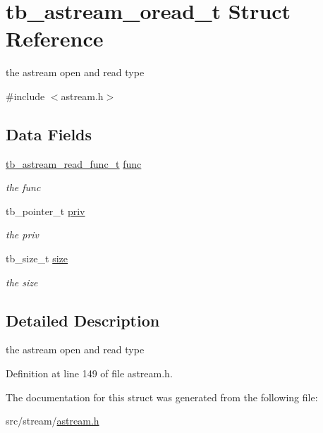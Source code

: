 \hypertarget{structtb__astream__oread__t}{\section{tb\-\_\-astream\-\_\-oread\-\_\-t Struct Reference}
\label{structtb__astream__oread__t}
}


the astream open and read type  




{\ttfamily \#include $<$astream.\-h$>$}

\subsection*{Data Fields}
\begin{DoxyCompactItemize}
\item 
\hypertarget{structtb__astream__oread__t_ae663c845768d8682b3db64a096a4ef1b}{\hyperlink{astream_8h_a94c551da39b2f5d59cf37a8154267c00}{tb\-\_\-astream\-\_\-read\-\_\-func\-\_\-t} \hyperlink{structtb__astream__oread__t_ae663c845768d8682b3db64a096a4ef1b}{func}}\label{structtb__astream__oread__t_ae663c845768d8682b3db64a096a4ef1b}

\begin{DoxyCompactList}\small\item\em the func \end{DoxyCompactList}\item 
\hypertarget{structtb__astream__oread__t_a708c7917b37aa5345e47e0ce098f335a}{tb\-\_\-pointer\-\_\-t \hyperlink{structtb__astream__oread__t_a708c7917b37aa5345e47e0ce098f335a}{priv}}\label{structtb__astream__oread__t_a708c7917b37aa5345e47e0ce098f335a}

\begin{DoxyCompactList}\small\item\em the priv \end{DoxyCompactList}\item 
\hypertarget{structtb__astream__oread__t_a9acbfdebce1afbadd91de58028dcf84f}{tb\-\_\-size\-\_\-t \hyperlink{structtb__astream__oread__t_a9acbfdebce1afbadd91de58028dcf84f}{size}}\label{structtb__astream__oread__t_a9acbfdebce1afbadd91de58028dcf84f}

\begin{DoxyCompactList}\small\item\em the size \end{DoxyCompactList}\end{DoxyCompactItemize}


\subsection{Detailed Description}
the astream open and read type 

Definition at line 149 of file astream.\-h.



The documentation for this struct was generated from the following file\-:\begin{DoxyCompactItemize}
\item 
src/stream/\hyperlink{astream_8h}{astream.\-h}\end{DoxyCompactItemize}
